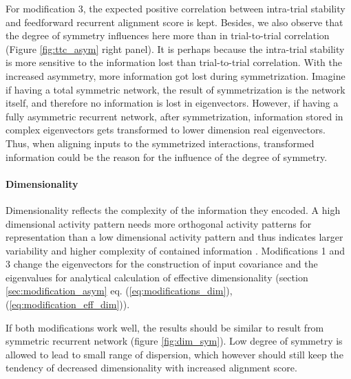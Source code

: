 \documentclass[11pt]{article}
\begin{document}
	For modification 3, the expected positive correlation between intra-trial stability and feedforward recurrent alignment score is kept. Besides, we also observe that the degree of symmetry influences here more than in trial-to-trial correlation (Figure \ref{fig:ttc_asym} right panel). It is perhaps because the intra-trial stability is more sensitive to the information lost than trial-to-trial correlation. With the increased asymmetry, more information got lost during symmetrization. Imagine if having a total symmetric network, the result of symmetrization is the network itself, and therefore no information is lost in eigenvectors. However, if having a fully asymmetric recurrent network, after symmetrization, information stored in complex eigenvectors gets transformed to lower dimension real eigenvectors. Thus, when aligning inputs to the symmetrized interactions, transformed information could be the reason for the influence of the degree of symmetry. 
	\vspace{0.5cm}
	\paragraph{Dimensionality}
	
	Dimensionality reflects the complexity of the information they encoded. A high dimensional activity pattern needs more orthogonal activity patterns for representation than a low dimensional activity pattern and thus indicates larger variability and higher complexity of contained information \cite{tragenap2023nature, bartolo2020dimensionality, badre2021dimensionality}. Modifications 1 and 3 change the eigenvectors for the construction of input covariance and the eigenvalues for analytical calculation of effective dimensionality (section \ref{sec:modification_asym} eq. (\ref{eq:modifications_dim}), (\ref{eq:modification_eff_dim})). 
	
	If both modifications work well, the results should be similar to result from symmetric recurrent network (figure \ref{fig:dim_sym}). Low degree of symmetry is allowed to lead to small range of dispersion, which however should still keep the tendency of decreased dimensionality with increased alignment score. %
	
\end{document}
